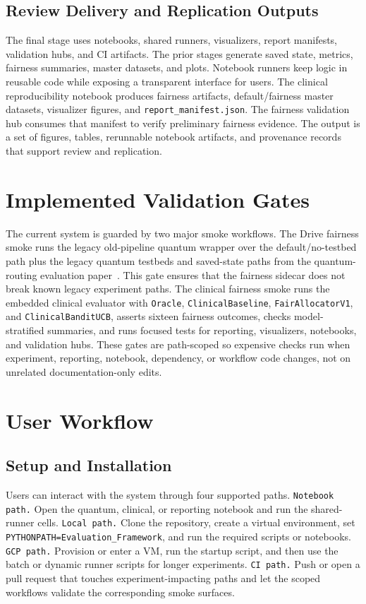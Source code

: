 \documentclass{IEEEtran}
\newcommand{\quantumPaper}{the quantum-routing evaluation paper~\cite{garcia2026threat_aware_quantum_routing}\xspace}
\begin{document}
\subsection{Review Delivery and Replication Outputs}
The final stage uses notebooks, shared runners, visualizers, report manifests, validation hubs, and CI artifacts. The prior stages generate saved state, metrics, fairness summaries, master datasets, and plots. Notebook runners keep logic in reusable code while exposing a transparent interface for users. The clinical reproducibility notebook produces fairness artifacts, default/fairness master datasets, visualizer figures, and \texttt{report\_manifest.json}. The fairness validation hub consumes that manifest to verify preliminary fairness evidence. The output is a set of figures, tables, rerunnable notebook artifacts, and provenance records that support review and replication.

\section{Implemented Validation Gates}

The current system is guarded by two major smoke workflows. The Drive fairness smoke runs the legacy old-pipeline quantum wrapper over the default/no-testbed path plus the legacy quantum testbeds and saved-state paths from \quantumPaper. This gate ensures that the fairness sidecar does not break known legacy experiment paths. The clinical fairness smoke runs the embedded clinical evaluator with \texttt{Oracle}, \texttt{ClinicalBaseline}, \texttt{FairAllocatorV1}, and \texttt{ClinicalBanditUCB}, asserts sixteen fairness outcomes, checks model-stratified summaries, and runs focused tests for reporting, visualizers, notebooks, and validation hubs. These gates are path-scoped so expensive checks run when experiment, reporting, notebook, dependency, or workflow code changes, not on unrelated documentation-only edits.

\section{User Workflow}

\subsection{Setup and Installation}
Users can interact with the system through four supported paths. \texttt{Notebook path.} Open the quantum, clinical, or reporting notebook and run the shared-runner cells. \texttt{Local path.} Clone the repository, create a virtual environment, set \texttt{PYTHONPATH=Evaluation\_Framework}, and run the required scripts or notebooks. \texttt{GCP path.} Provision or enter a VM, run the startup script, and then use the batch or dynamic runner scripts for longer experiments. \texttt{CI path.} Push or open a pull request that touches experiment-impacting paths and let the scoped workflows validate the corresponding smoke surfaces.
\end{document}
